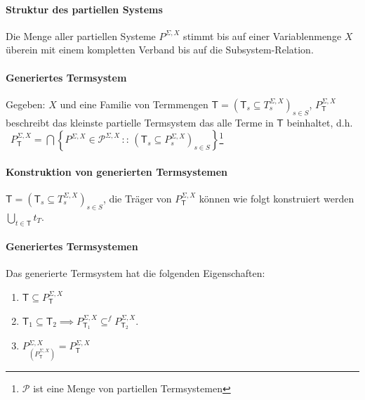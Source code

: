\paragraph{ Struktur des partiellen Systems}
Die Menge aller partiellen Systeme $P^{\Sigma,X}$ stimmt bis auf einer Variablenmenge $X$ überein mit einem kompletten Verband bis auf die Subsystem-Relation.

\paragraph{ Generiertes Termsystem}
Gegeben: $X$ und eine Familie von Termmengen $\mathsf{T}=\left(\mathsf{T}_{s}\subseteq T_{s}^{\Sigma,X}\right)_{s\in S}$,
$P_{\mathsf{T}}^{\Sigma,X}$ beschreibt das kleinste partielle Termsystem
das alle Terme in  $\mathsf{T}$ beinhaltet, d.h. ~$P_{\mathsf{T}}^{\Sigma,X}=\bigcap\left\{ P^{\Sigma,X}\in\mathcal{P}^{\Sigma,X}\,::\,\left(\mathsf{T}_{s}\subseteq P_{s}^{\Sigma,X}\right)_{s\in S}\right\}$\footnote{$\mathcal{P}$ ist eine Menge von partiellen Termsystemen} 


\paragraph{ Konstruktion von generierten Termsystemen}
$\mathsf{T}=\left(\mathsf{T}_{s}\subseteq T_{s}^{\Sigma,X}\right)_{s\in S}$,
die Träger von $P_{\mathsf{T}}^{\Sigma,X}$ können wie folgt konstruiert werden
$\underset{t\in\mathsf{T}}{\bigcup}t_{T}$.


\paragraph{ Generiertes Termsystemen}
Das generierte Termsystem hat die folgenden Eigenschaften: 
\begin{enumerate}
\item $\mathsf{T}\subseteq P_{\mathsf{T}}^{\Sigma,X}$
\item $\mathsf{T}_{1}\subseteq\mathsf{T}_{2}\implies P_{\mathsf{T}_{1}}^{\Sigma,X}\subseteq^{f}P_{\mathsf{T}_{2}}^{\Sigma,X}$.
\item $P_{\left(P_{\mathsf{T}}^{\Sigma,X}\right)}^{\Sigma,X}=P_{\mathsf{T}}^{\Sigma,X}$
\end{enumerate}

